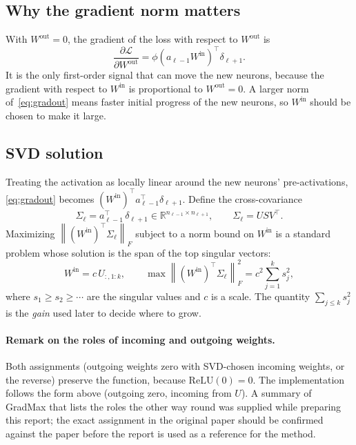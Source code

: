 \documentclass[11pt,a4paper]{article}
\newcommand{\R}{\mathbb{R}}
\newcommand{\norm}[1]{\left\lVert #1\right\rVert}
\begin{document}
\subsection{Why the gradient norm matters}
With $W^{\mathrm{out}}=0$, the gradient of the loss with respect to $W^{\mathrm{out}}$ is
\begin{equation}
\frac{\partial \mathcal{L}}{\partial W^{\mathrm{out}}}
= \phi\!\left(a_{\ell-1}W^{\mathrm{in}}\right)^{\!\top}\delta_{\ell+1}.
\label{eq:gradout}
\end{equation}
It is the only first-order signal that can move the new neurons, because the gradient with respect to $W^{\mathrm{in}}$ is proportional to $W^{\mathrm{out}}=0$. A larger norm of~\eqref{eq:gradout} means faster initial progress of the new neurons, so $W^{\mathrm{in}}$ should be chosen to make it large.

\subsection{SVD solution}
Treating the activation as locally linear around the new neurons' pre-activations, \eqref{eq:gradout} becomes $(W^{\mathrm{in}})^{\top} a_{\ell-1}^{\top}\delta_{\ell+1}$. Define the cross-covariance
\begin{equation}
\Sigma_\ell = a_{\ell-1}^{\top}\,\delta_{\ell+1} \in \R^{n_{\ell-1}\times n_{\ell+1}},
\qquad \Sigma_\ell = U S V^{\top}.
\label{eq:svd}
\end{equation}
Maximizing $\norm{(W^{\mathrm{in}})^{\top}\Sigma_\ell}_F$ subject to a norm bound on $W^{\mathrm{in}}$ is a standard problem whose solution is the span of the top singular vectors:
\begin{equation}
W^{\mathrm{in}} = c\,U_{:,1:k},
\qquad
\max \norm{(W^{\mathrm{in}})^{\top}\Sigma_\ell}_F^{2} = c^{2}\sum_{j=1}^{k}s_j^{2},
\label{eq:win}
\end{equation}
where $s_1\ge s_2\ge\cdots$ are the singular values and $c$ is a scale. The quantity $\sum_{j\le k}s_j^2$ is the \emph{gain} used later to decide where to grow.

\paragraph{Remark on the roles of incoming and outgoing weights.}
Both assignments (outgoing weights zero with SVD-chosen incoming weights, or the reverse) preserve the function, because $\mathrm{ReLU}(0)=0$. The implementation follows the form above (outgoing zero, incoming from $U$). A summary of GradMax that lists the roles the other way round was supplied while preparing this report; the exact assignment in the original paper should be confirmed against the paper before the report is used as a reference for the method.
\end{document}
